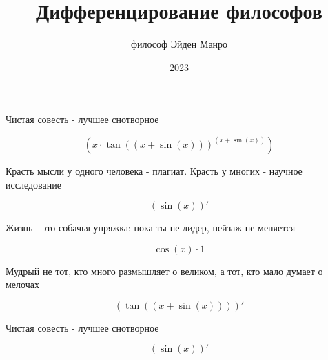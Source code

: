 \documentclass[a4paper,12pt]{article}
\title{\textbf{Дифференцирование философов}}
\author{философ Эйден Манро}
\date{2023}
\begin{document}
\maketitle
\begin{center}
Чистая совесть - лучшее снотворное
\end{center}

\begin{center}
\begin{equation}
(x \cdot \tan((x + \sin(x)))^{(x + \sin(x))})
\end{equation}
\end{center}

\begin{center}
Красть мысли у одного человека - плагиат. Красть у многих - научное исследование
\end{center}

\begin{center}
\begin{equation}
(\sin(x))'
\end{equation}
\end{center}

\begin{center}
Жизнь - это собачья упряжка: пока ты не лидер, пейзаж не меняется
\end{center}

\begin{center}
\begin{equation}
\cos(x) \cdot 1
\end{equation}
\end{center}

\begin{center}
Мудрый не тот, кто много размышляет о великом, а тот, кто мало думает о мелочах
\end{center}

\begin{center}
\begin{equation}
(\tan((x + \sin(x))))'
\end{equation}
\end{center}

\begin{center}
Чистая совесть - лучшее снотворное
\end{center}

\begin{center}
\begin{equation}
(\sin(x))'
\end{equation}
\end{center}
\end{document}
